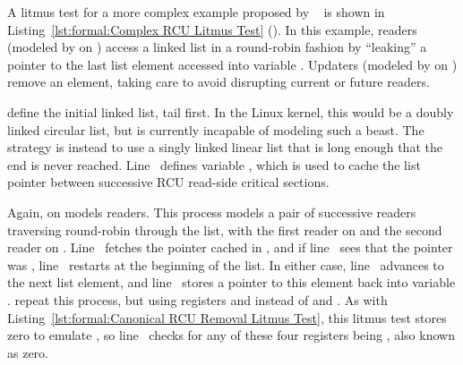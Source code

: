 \begin{fcvref}
A litmus test for a more complex example proposed by
~\cite{RomanPenyaev2018rrRCU} is shown in
Listing~\ref{lst:formal:Complex RCU Litmus Test}
().
In this example, readers (modeled by  on
) access a linked list
in a round-robin fashion by ``leaking'' a pointer to the last
list element accessed into variable .
Updaters (modeled by  on )
remove an element, taking care to avoid disrupting current or future
readers.

\QuickQuizEnd

 define the initial linked
list, tail first.
In the Linux kernel, this would be a doubly linked circular list,
but  is currently incapable of modeling such a beast.
The strategy is instead to use a singly linked linear list that
is long enough that the end is never reached.
Line~ defines variable , which is used to
cache the list pointer between successive RCU read-side critical
sections.

Again,  on  models readers.
This process models a pair of successive readers traversing round-robin
through the list, with the first reader on 
and the second reader on .
Line~ fetches the pointer cached in , and if
line~ sees that the pointer was ,
line~ restarts at the beginning of the list.
In either case, line~ advances to the next list element,
and line~ stores a pointer to this element back into
variable .
 repeat this process, but using
registers  and  instead of  and .
As with
Listing~\ref{lst:formal:Canonical RCU Removal Litmus Test},
this litmus test stores zero to emulate , so
line~ checks for any of these four registers being
, also known as zero.


\end{fcvref}
